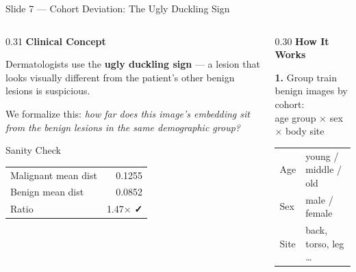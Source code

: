 \documentclass[aspectratio=169, 9pt]{beamer}
\begin{document}
\begin{frame}{Slide 7 --- Cohort Deviation: The Ugly Duckling Sign}

  \begin{columns}[T]

    \begin{column}{0.31\textwidth}
      \textbf{\color{navyblue}Clinical Concept}

      \vspace{0.3em}
      {\small
      Dermatologists use the \textbf{ugly duckling sign} --- a lesion that looks
      visually different from the patient's other benign lesions is suspicious.

      \vspace{0.3em}
      We formalize this: \textit{how far does this image's embedding sit from
      the benign lesions in the same demographic group?}
      }

      \vspace{0.4em}
      \begin{exampleblock}{Sanity Check}
        \small
        \begin{tabular}{@{}lr@{}}
          Malignant mean dist & 0.1255 \\
          Benign mean dist    & 0.0852 \\
          Ratio               & 1.47$\times$ \textbf{✓} \\
        \end{tabular}
      \end{exampleblock}
    \end{column}

    \begin{column}{0.30\textwidth}
      \textbf{\color{navyblue}How It Works}

      \vspace{0.3em}
      {\small
      \textbf{1.} Group train benign images by cohort:\\
      \quad age group $\times$ sex $\times$ body site

      \vspace{0.25em}
      \begin{tabular}{@{}ll@{}}
        Age  & young / middle / old \\
        Sex  & male / female \\
        Site & back, torso, leg \ldots \\
      \end{tabular}

}
\end{column}
\end{columns}
\end{frame}
\end{document}
